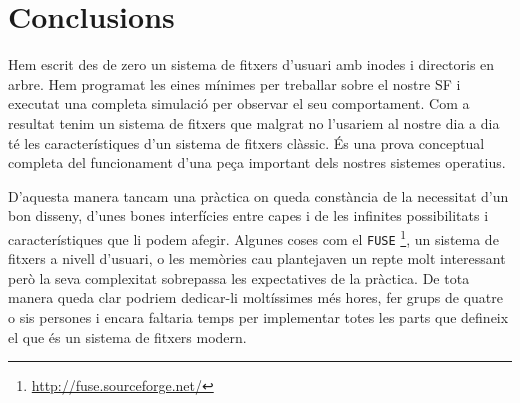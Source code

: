 \section{Conclusions}

Hem escrit des de zero un sistema de fitxers d'usuari amb inodes i directoris
en arbre. Hem programat les eines mínimes per treballar sobre el nostre SF i
executat una completa simulació per observar el seu comportament. Com a
resultat tenim un sistema de fitxers que malgrat no l'usariem al nostre dia a
dia té les característiques d'un sistema de fitxers clàssic. És una prova
conceptual completa del funcionament d'una peça important dels nostres sistemes
operatius.

D'aquesta manera tancam una pràctica on queda constància de la necessitat d'un
bon disseny, d'unes bones interfícies entre capes i de les infinites
possibilitats i característiques que li podem afegir. Algunes coses com el
\verb+FUSE+ \footnote{ \url{http://fuse.sourceforge.net/} }, un sistema de
fitxers a nivell d'usuari, o les memòries cau plantejaven un repte molt
interessant però la seva complexitat sobrepassa les expectatives de la
pràctica. De tota manera queda clar podriem dedicar-li moltíssimes més hores,
fer grups de quatre o sis persones i encara faltaria temps per implementar
totes les parts que defineix el que és un sistema de fitxers modern.
